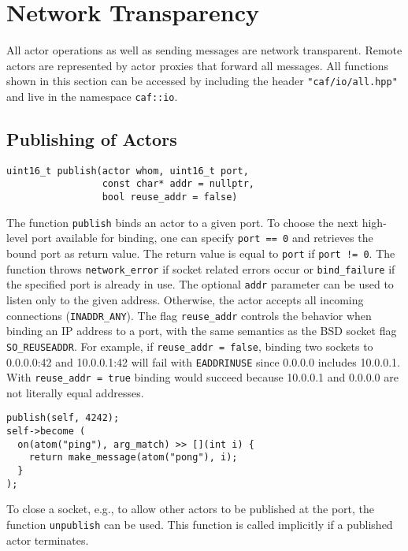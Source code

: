 \section{Network Transparency}

All actor operations as well as sending messages are network transparent.
Remote actors are represented by actor proxies that forward all messages.
All functions shown in this section can be accessed by including the header \lstinline^"caf/io/all.hpp"^ and live in the namespace \lstinline^caf::io^.

\subsection{Publishing of Actors}

\begin{lstlisting}
uint16_t publish(actor whom, uint16_t port,
                 const char* addr = nullptr,
                 bool reuse_addr = false)
\end{lstlisting}

The function \lstinline^publish^ binds an actor to a given port.
To choose the next high-level port available for binding, one can specify \lstinline^port == 0^ and retrieves the bound port as return value.
The return value is equal to \lstinline^port^ if \lstinline^port != 0^.
The function throws \lstinline^network_error^ if socket related errors occur or \lstinline^bind_failure^ if the specified port is already in use.
The optional \lstinline^addr^ parameter can be used to listen only to the given address.
Otherwise, the actor accepts all incoming connections (\lstinline^INADDR_ANY^).
The flag \lstinline^reuse_addr^ controls the behavior when binding an IP
address to a port, with the same semantics as the BSD socket flag \lstinline^SO_REUSEADDR^.
For example, if \lstinline^reuse_addr = false^, binding two sockets to 0.0.0.0:42 and 10.0.0.1:42 will fail with \texttt{EADDRINUSE} since 0.0.0.0 includes 10.0.0.1. 
With \lstinline^reuse_addr = true^ binding would succeed because 10.0.0.1 and
0.0.0.0 are not literally equal addresses.


\begin{lstlisting}
publish(self, 4242);
self->become (
  on(atom("ping"), arg_match) >> [](int i) {
    return make_message(atom("pong"), i);
  }
);
\end{lstlisting}

To close a socket, e.g., to allow other actors to be published at the port, the function \lstinline^unpublish^ can be used.
This function is called implicitly if a published actor terminates.

